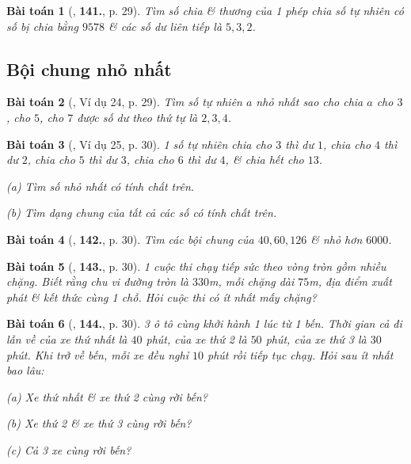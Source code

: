\documentclass{article}
\numberwithin{equation}{section}
\newtheorem{baitoan}{Bài toán}[section]
\begin{document}
\begin{baitoan}[\cite{Binh_Toan_6_tap_1}, \textbf{141.}, p. 29]
	Tìm số chia \& thương của 1 phép chia số tự nhiên có số bị chia bằng $9578$ \& các số dư liên tiếp là $5,3,2$.
\end{baitoan}

\subsection{Bội chung nhỏ nhất}
\begin{baitoan}[\cite{Binh_Toan_6_tap_1}, Ví dụ 24, p. 29]
	Tìm số tự nhiên $a$ nhỏ nhất sao cho chia $a$ cho $3$, cho $5$, cho $7$ được số dư theo thứ tự là $2,3,4$.	
\end{baitoan}

\begin{baitoan}[\cite{Binh_Toan_6_tap_1}, Ví dụ 25, p. 30]
	1 số tự nhiên chia cho $3$ thì dư $1$, chia cho $4$ thì dư $2$, chia cho $5$ thì dư $3$, chia cho $6$ thì dư $4$, \& chia hết cho $13$.
	\begin{enumerate*}
		\item[(a)] Tìm số nhỏ nhất có tính chất trên.
		\item[(b)] Tìm dạng chung của tất cả các số có tính chất trên.
	\end{enumerate*}
\end{baitoan}

\begin{baitoan}[\cite{Binh_Toan_6_tap_1}, \textbf{142.}, p. 30]
	Tìm các bội chung của $40,60,126$ \& nhỏ hơn $6000$.
\end{baitoan}

\begin{baitoan}[\cite{Binh_Toan_6_tap_1}, \textbf{143.}, p. 30]
	1 cuộc thi chạy tiếp sức theo vòng tròn gồm nhiều chặng. Biết rằng chu vi đường tròn là $330$m, mỗi chặng dài $75$m, địa điểm xuất phát \& kết thức cùng 1 chỗ. Hỏi cuộc thi có ít nhất mấy chặng?
\end{baitoan}

\begin{baitoan}[\cite{Binh_Toan_6_tap_1}, \textbf{144.}, p. 30]
	3 ô tô cùng khởi hành 1 lúc từ 1 bến. Thời gian cả đi lẫn về của xe thứ nhất là $40$ phút, của xe thứ 2 là $50$ phút, của xe thứ 3 là $30$ phút. Khi trở về bến, mỗi xe đều nghỉ $10$ phút rồi tiếp tục chạy. Hỏi sau ít nhất bao lâu:
	\begin{enumerate*}
		\item[(a)] Xe thứ nhất \& xe thứ 2 cùng rời bến?
		\item[(b)] Xe thứ 2 \& xe thứ 3 cùng rời bến?
		\item[(c)] Cả 3 xe cùng rời bến?
	\end{enumerate*}
\end{baitoan}
\end{document}
